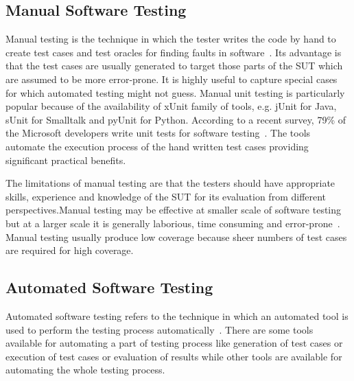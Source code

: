 
\subsection{Manual Software Testing}
Manual testing is the technique in which the tester writes the code by hand to create test cases and test oracles for finding faults in software~\cite{ciupa2008finding}. Its advantage is that the test cases are usually generated to target those parts of the SUT which are assumed to be more error-prone. It is highly useful to capture special cases for which automated testing might not guess. Manual unit testing is particularly popular because of the availability of xUnit family of tools, e.g. jUnit for Java, sUnit for Smalltalk and pyUnit for Python. According to a recent survey, 79\% of the Microsoft developers write unit tests for software testing~\cite{leitner2009effectiveness}. The tools automate the execution process of the hand written test cases providing significant practical benefits.  

The limitations of manual testing are that the testers should have appropriate skills, experience and knowledge of the SUT for its evaluation from different perspectives.Manual testing may be effective at smaller scale of software testing but at a larger scale it is generally laborious, time consuming and error-prone~\cite{tretmans2000automatic}. Manual testing usually produce low coverage because sheer numbers of test cases are required for high coverage.


 
\subsection{Automated Software Testing}
Automated software testing refers to the technique in which an automated tool is used to perform the testing process automatically~\cite{leitner2007reconciling}. There are some tools available for automating a part of testing process like generation of test cases or execution of test cases or evaluation of results while other tools are available for automating the whole testing process. 

